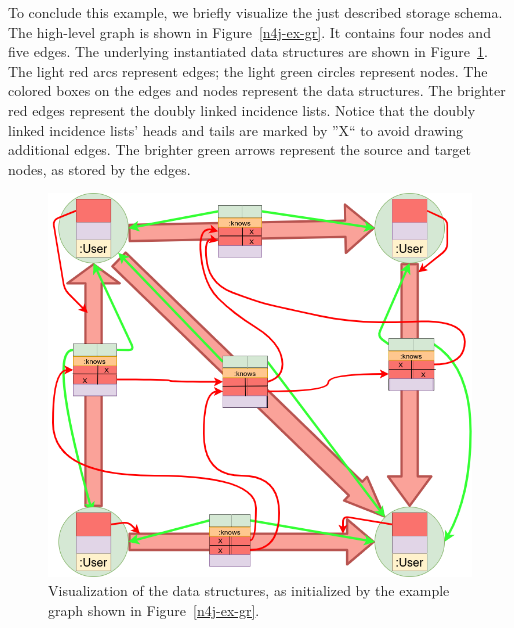        To conclude this example, we briefly visualize the just described storage schema. 
        The high-level graph is shown in Figure~\ref{n4j-ex-gr}.
        It contains four nodes and five edges.
        The underlying instantiated data structures are shown in Figure~\ref{n4j-ex}.
        The light red arcs represent edges; the light green circles represent nodes.
        The colored boxes on the edges and nodes represent the data structures.
        The brighter red edges represent the doubly linked incidence lists.
        Notice that the doubly linked incidence lists' heads and tails are marked by ''X`` to avoid drawing additional edges.
        The brighter green arrows represent the source and target nodes, as stored by the edges.
        \vfill
        \begin{figure}[htp]
            \begin{center}
                \includegraphics[keepaspectratio,height=\textheight,width=\textwidth]{img/04-databases/example_structs.png}
            \end{center}
            \caption{Visualization of the data structures, as initialized by the example graph shown in Figure~\ref{n4j-ex-gr}.}
            \label{n4j-ex}
        \end{figure}
        \vfill
